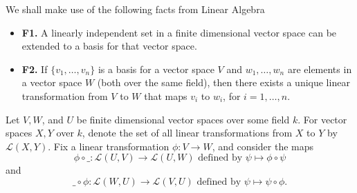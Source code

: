 \documentclass[9pt]{article}
\begin{document}
We shall make use of the following facts from Linear Algebra
\begin{itemize}
   \item \textbf{F1.} A linearly independent set in a finite dimensional vector
         space can be extended to a basis for that vector space.
   \item \textbf{F2.} If $\{v_1, \ldots, v_n\}$ is a basis for a vector space
         $V$ and $w_1, \ldots, w_n$ are elements in a vector space $W$ (both
         over the same field), then there exists a unique linear transformation
         from $V$ to $W$ that maps $v_i$ to $w_i$, for $i = 1, \ldots, n$.
\end{itemize}
Let $V, W$, and $U$ be finite dimensional vector spaces over some field $k$. For 
vector spaces $X, Y$ over $k$, denote the set of all linear transformations from
$X$ to $Y$ by $\mathcal{L}(X, Y)$. Fix a linear transformation
$\phi : V \rightarrow W$, and consider the maps
$$\phi \circ \_ : \mathcal{L}(U, V) \rightarrow \mathcal{L}(U, W)
  \text{ defined by } \psi \mapsto \phi \circ \psi$$
and
$$\_ \circ \phi : \mathcal{L}(W, U) \rightarrow \mathcal{L}(V, U)
  \text{ defined by } \psi \mapsto \psi \circ \phi.$$
\end{document}
